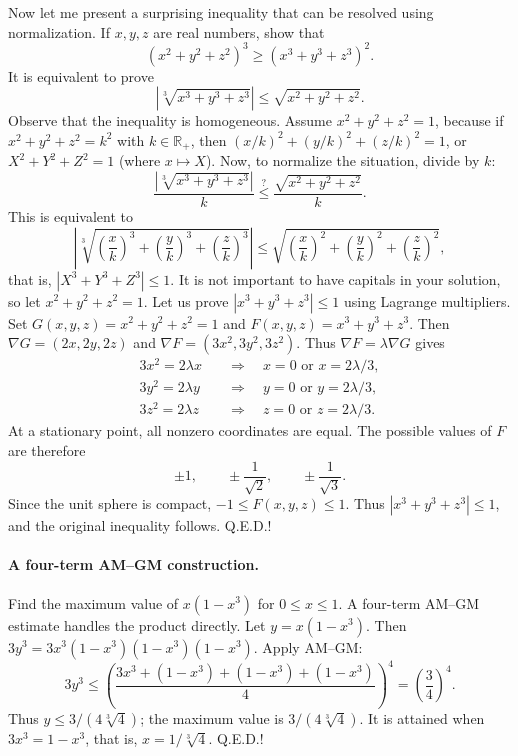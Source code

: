 \documentclass[11pt,a4paper]{article}
\begin{document}
Now let me present a surprising inequality that can be resolved using normalization.
If $x,y,z$ are real numbers, show that
\[(x^2+y^2+z^2)^3\geq(x^3+y^3+z^3)^2.\]
It is equivalent to prove
\[
\left|\sqrt[3]{x^3+y^3+z^3}\right|
\leq\sqrt{x^2+y^2+z^2}.
\]
Observe that the inequality is homogeneous.
Assume $x^2+y^2+z^2=1$, because if
$x^2+y^2+z^2=k^2$ with $k\in\mathbb R_+$, then
$(x/k)^2+(y/k)^2+(z/k)^2=1$, or $X^2+Y^2+Z^2=1$
(where $x\mapsto X$).
Now, to normalize the situation, divide by $k$:
\[
\frac{\left|\sqrt[3]{x^3+y^3+z^3}\right|}{k}
\mathrel{\stackrel{?}{\leq}}
\frac{\sqrt{x^2+y^2+z^2}}{k}.
\]
This is equivalent to
\[
\left|\sqrt[3]{\left(\frac xk\right)^3+
\left(\frac yk\right)^3+
\left(\frac zk\right)^3}\right|
\leq
\sqrt{\left(\frac xk\right)^2+
\left(\frac yk\right)^2+
\left(\frac zk\right)^2},
\]
that is, $|X^3+Y^3+Z^3|\leq1$.
It is not important to have capitals in your solution, so let
$x^2+y^2+z^2=1$.
Let us prove $|x^3+y^3+z^3|\leq1$ using Lagrange multipliers.
Set $G(x,y,z)=x^2+y^2+z^2=1$ and
$F(x,y,z)=x^3+y^3+z^3$.
Then $\nabla G=(2x,2y,2z)$ and
$\nabla F=(3x^2,3y^2,3z^2)$.
Thus $\nabla F=\lambda\nabla G$ gives
\[
\begin{aligned}
3x^2=2\lambda x&\quad\Longrightarrow\quad x=0\text{ or }x=2\lambda/3,\\
3y^2=2\lambda y&\quad\Longrightarrow\quad y=0\text{ or }y=2\lambda/3,\\
3z^2=2\lambda z&\quad\Longrightarrow\quad z=0\text{ or }z=2\lambda/3.
\end{aligned}
\]
At a stationary point, all nonzero coordinates are equal. The possible values
of $F$ are therefore
\[
\pm1,\qquad \pm\frac1{\sqrt2},\qquad \pm\frac1{\sqrt3}.
\]
Since the unit sphere is compact, $-1\leq F(x,y,z)\leq1$.
Thus $|x^3+y^3+z^3|\leq1$, and the original inequality follows. Q.E.D.!

\paragraph{A four-term AM--GM construction.}
Find the maximum value of $x(1-x^3)$ for $0\leq x\leq1$.
A four-term AM--GM estimate handles the product directly.
Let $y=x(1-x^3)$. Then $3y^3=3x^3(1-x^3)(1-x^3)(1-x^3)$.
Apply AM--GM:
\[3y^3\leq\left(\frac{3x^3+(1-x^3)+(1-x^3)+(1-x^3)}4\right)^4
=\left(\frac34\right)^4.\]
Thus $y\leq3/(4\sqrt[3]4)$; the maximum value is $3/(4\sqrt[3]4)$.
It is attained when $3x^3=1-x^3$, that is, $x=1/\sqrt[3]4$. Q.E.D.!
\end{document}
